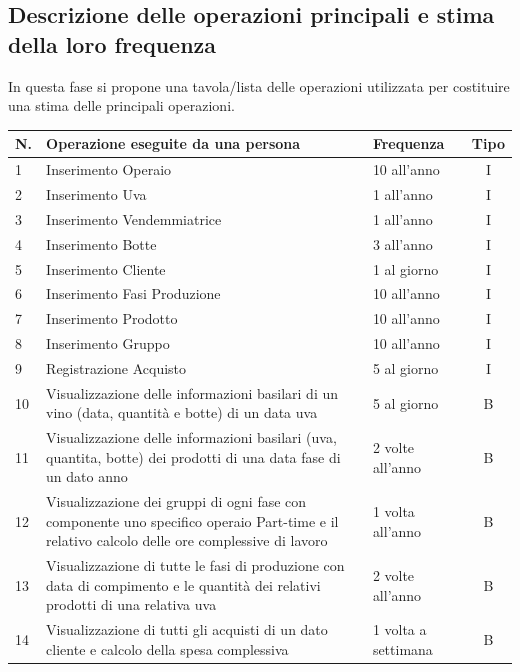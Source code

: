 \documentclass{article}
\begin{document}
\subsection{Descrizione delle operazioni principali e stima della loro frequenza} 
In questa fase si propone una tavola/lista delle operazioni utilizzata per costituire una stima delle principali operazioni.\
\newline
\newline
\begin{tabular}{p{} |p{}| p{}| c}\hline
    \textbf{N.} & \textbf{Operazione eseguite da una persona} & \textbf{Frequenza}  & \textbf{Tipo} \\\hline
    1&Inserimento Operaio & 10 all'anno & I \\\hline
    2&Inserimento Uva & 1 all'anno & I\\\hline
    3&Inserimento Vendemmiatrice & 1 all'anno & I\\\hline
    4&Inserimento Botte & 3 all'anno & I\\\hline
    5&Inserimento Cliente & 1 al giorno& I\\\hline
    6&Inserimento Fasi Produzione & 10 all'anno & I\\\hline
    7&Inserimento Prodotto & 10 all'anno &I \\\hline
    8&Inserimento Gruppo & 10 all'anno  &I \\\hline
    9&Registrazione Acquisto & 5 al giorno & I \\\hline
    10&Visualizzazione delle informazioni basilari di un vino (data, quantità e botte) di un data uva &5 al giorno & B\\\hline
    11&Visualizzazione delle informazioni basilari (uva, quantita, botte) dei prodotti di una data fase di un dato anno& 2 volte all'anno & B\\\hline
    12&Visualizzazione dei gruppi di ogni fase con componente uno specifico operaio Part-time e il relativo calcolo delle ore complessive di lavoro& 1 volta all'anno&B\\\hline
    13&Visualizzazione di tutte le fasi di produzione con data di compimento e le quantità dei relativi prodotti di una relativa uva &2 volte all'anno&B\\\hline
    14&Visualizzazione di tutti gli acquisti di un dato cliente e calcolo della spesa complessiva & 1 volta a settimana&B\\\hline
\end{tabular}
\newline
\end{document}
